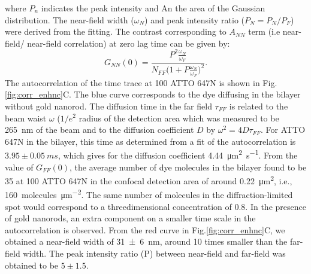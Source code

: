 where $P_n$ indicates the peak intensity and An the area of the Gaussian distribution.
The near-field width ($\omega_N$) and peak intensity ratio ($P_N=P_N/P_F$) were derived from the fitting. 
The contrast corresponding to $A_{NN}$ term (i.e near-field/ near-field correlation) at zero lag time can be given by:
\begin{equation}
	G_{NN}(0) = \frac{P^2\frac{\omega_N}{\omega_F}} {N_{FF}\Big(1+P\frac{\omega_N}{\omega_F}\Big)^2}.
	\label{eqm:contrast_enhnc}
\end{equation}
The autocorrelation of the time trace at \SI{100}{\nM} ATTO 647N is shown in Fig.\ref{fig:corr_enhnc}C.
The blue curve corresponds to the dye diffusing in the bilayer without gold nanorod.
The diffusion time in the far field $\tau_{FF}$ is related to the beam waist $\omega$ ($1/e^2$ radius of the detection area which was measured to be \SI{265}{\nm} of the beam and to the diffusion coefficient $D$ by $\omega^2=4D\tau_{FF}$.
For ATTO 647N in the bilayer, this time as determined from a fit of the autocorrelation is $3.95\pm0.05~ms$, which gives for the diffusion coefficient \SI{4.44}{\um\squared\per\s}.
From the value of $G_{FF}(0)$, the average number of dye molecules in the bilayer found to be 35 at \SI{100}{\nM} ATTO 647N in the confocal detection area of around \SI{0.22}{\um\squared}, i.e., \SI{160}{ molecules\per\um\squared}.
The same number of molecules in the diffraction-limited spot would correspond to a threedimensional concentration of \SI{0.8}{\uM}.
In the presence of gold nanorods, an extra component on a smaller time scale in the autocorrelation is observed.
From the red curve in Fig.\ref{fig:corr_enhnc}C, we obtained a near-field width of \SI[separate-uncertainty = true]{31(6)}{\nm}, around 10 times smaller than the far-field width.
The peak intensity ratio (P) between near-field and far-field was obtained to be $5\pm1.5$.
